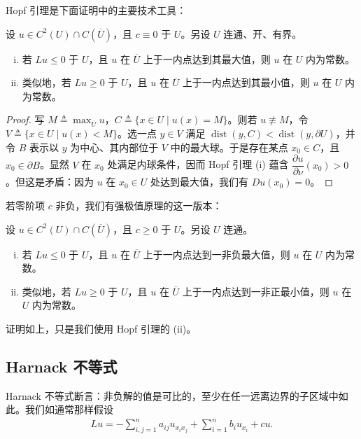 \documentclass[../../main.tex]{subfiles}
\begin{document}
Hopf 引理是下面证明中的主要技术工具：

\begin{theorem}[强极值原理]\label{theorem:ch06-强极值}设 $u\in C^{2}(U)\cap C(\overline{U})$，且 $c\equiv 0$ 于 $U$。另设 $U$ 连通、开、有界。
\begin{enumerate}[(i)]
\item 若 $Lu\leqslant 0$ 于 $U$，且 $u$ 在 $\overline{U}$ 上于一内点达到其最大值，则 $u$ 在 $U$ 内为常数。
\item 类似地，若 $Lu\geqslant 0$ 于 $U$，且 $u$ 在 $\overline{U}$ 上于一内点达到其最小值，则 $u$ 在 $U$ 内为常数。
\end{enumerate}
\end{theorem}

\begin{proof}
写 $M\triangleq\max_{\overline{U}}u$，$C\triangleq\{x\in U\mid u(x)=M\}$。则若 $u\not\equiv M$，令 $V\triangleq\{x\in U\mid u(x)<M\}$。选一点 $y\in V$ 满足 $\operatorname{dist}(y,C)<\operatorname{dist}(y,\partial U)$，并令 $B$ 表示以 $y$ 为中心、其内部位于 $V$ 中的最大球。于是存在某点 $x_{0}\in C$，且 $x_{0}\in\partial B$。显然 $V$ 在 $x_{0}$ 处满足内球条件，因而 Hopf 引理 (i) 蕴含 $\dfrac{\partial u}{\partial\nu}(x_{0})>0$。但这是矛盾：因为 $u$ 在 $x_{0}\in U$ 处达到最大值，我们有 $Du(x_{0})=0$。
\end{proof}

若零阶项 $c$ 非负，我们有强极值原理的这一版本：

\begin{theorem}\label{theorem:ch06-c非负强极值}设 $u\in C^{2}(U)\cap C(\overline{U})$，且 $c\geqslant 0$ 于 $U$。另设 $U$ 连通。
\begin{enumerate}[(i)]
\item 若 $Lu\leqslant 0$ 于 $U$，且 $u$ 在 $\overline{U}$ 上于一内点达到一非负最大值，则 $u$ 在 $U$ 内为常数。
\item 类似地，若 $Lu\geqslant 0$ 于 $U$，且 $u$ 在 $\overline{U}$ 上于一内点达到一非正最小值，则 $u$ 在 $U$ 内为常数。
\end{enumerate}
\end{theorem}

证明如上，只是我们使用 Hopf 引理的 (ii)。

\subsection{Harnack 不等式}\label{subsection:ch06-Harnack}

Harnack 不等式断言：非负解的值是可比的，至少在任一远离边界的子区域中如此。我们如通常那样假设
\begin{align*}
Lu=-\sum_{i,j=1}^{n}a_{ij}u_{x_{i}x_{j}}+\sum_{i=1}^{n}b_{i}u_{x_{i}}+cu.
\end{align*}
\end{document}
